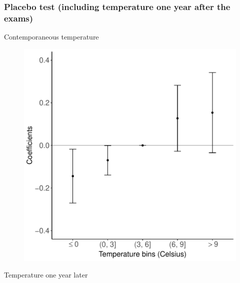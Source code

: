 \documentclass[9pt, pdfmx,hiresbb]{beamer}
\begin{document}
\begin{frame}\frametitle{Placebo test (including temperature one year after the exams)}
  \begin{minipage}{0.49\textwidth}
    \begin{center}
      Contemporaneous temperature
    \end{center}
    \begin{figure}[h]
      \centering
      \includegraphics[width = \textwidth]{../Output/images/reg_placebo_exam_4.pdf}
    \end{figure}
  \end{minipage}
  \begin{minipage}{0.49\textwidth}
    \begin{center}
      Temperature one year later
    \end{center}
    \begin{figure}[h]

\end{figure}
\end{minipage}
\end{frame}
\end{document}

